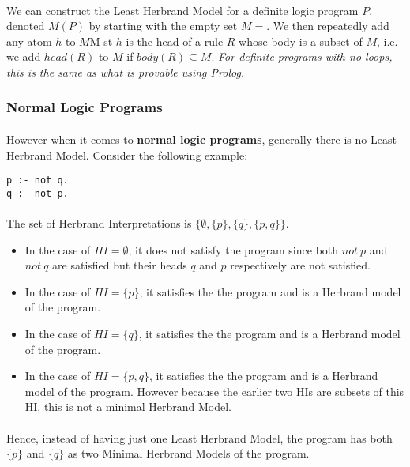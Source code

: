 \documentclass{article}
\theoremstyle{plain}
\theoremstyle{definition}
\begin{document}
\begin{multicols}{2}
\paragraph{} We can construct the Least Herbrand Model for a definite logic program $P$, denoted $M(P)$ by starting with the empty set $M = {}$. We then repeatedly add any atom $h$ to $M$M st $h$ is the head of a rule $R$ whose body is a subset of $M$, i.e. we add $head(R)$ to $M$ if $body(R) \subseteq M$. \textit{For definite programs with no loops, this is the same as what is provable using Prolog.}

\subsubsection{Normal Logic Programs}

\paragraph{} However when it comes to \textbf{normal logic programs}, generally there is no Least Herbrand Model. Consider the following example:

\begin{lstlisting}
p :- not q.
q :- not p.
\end{lstlisting}

\paragraph{} The set of Herbrand Interpretations is $\{\emptyset, \{p\}, \{q\}, \{p ,q\}\}$.

\begin{itemize}
\item In the case of $HI = \emptyset$, it does not satisfy the program since both $not\ p$ and $not\ q$ are satisfied but their heads $q$ and $p$ respectively are not satisfied. 
\item In the case of $HI = \{p\}$, it satisfies the the program and is a Herbrand model of the program.
\item In the case of $HI = \{q\}$, it satisfies the the program and is a Herbrand model of the program.
\item In the case of $HI = \{p, q\}$, it satisfies the the program and is a Herbrand model of the program. However because the earlier two HIs are subsets of this HI, this is not a minimal Herbrand Model.
\end{itemize}

\paragraph{} Hence, instead of having just one Least Herbrand Model, the program has both $\{p\}$ and $\{q\}$ as two Minimal Herbrand Models of the program.


\end{multicols}
\end{document}
